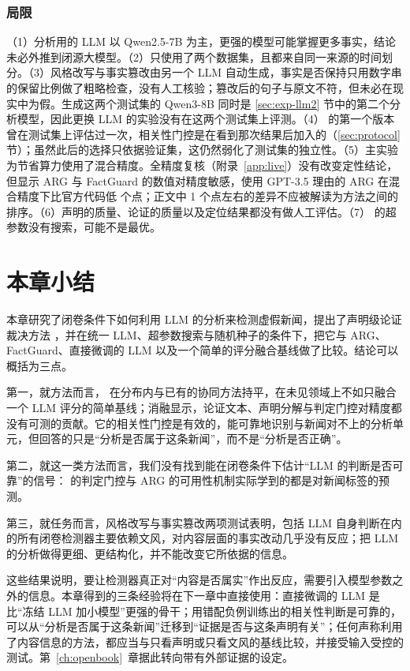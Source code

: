 \subsubsection{局限}
（1）分析用的 LLM 以 Qwen2.5-7B 为主，更强的模型可能掌握更多事实，结论未必外推到闭源大模型。（2）只使用了两个数据集，且都来自同一来源的时间划分。（3）风格改写与事实篡改由另一个 LLM 自动生成，事实是否保持只用数字串的保留比例做了粗略检查，没有人工核验；篡改后的句子与原文不符，但未必在现实中为假。生成这两个测试集的 Qwen3-8B 同时是 \ref{sec:exp-llm2} 节中的第二个分析模型，因此更换 LLM 的实验没有在这两个测试集上评测。（4）\method{} 的第一个版本曾在测试集上评估过一次，相关性门控是在看到那次结果后加入的（\ref{sec:protocol} 节）；虽然此后的选择只依据验证集，这仍然弱化了测试集的独立性。（5）主实验为节省算力使用了混合精度。全精度复核（附录~\ref{app:live}）没有改变定性结论，但显示 ARG 与 FactGuard 的数值对精度敏感，使用 GPT-3.5 理由的 ARG 在混合精度下比官方代码低  个点；正文中 1 个点左右的差异不应被解读为方法之间的排序。（6）声明的质量、论证的质量以及定位结果都没有做人工评估。（7）\method{} 的超参数没有搜索，可能不是最优。

\section{本章小结}\label{sec:ch3-summary}

本章研究了闭卷条件下如何利用 LLM 的分析来检测虚假新闻，提出了声明级论证裁决方法 \method{}，并在统一 LLM、超参数搜索与随机种子的条件下，把它与 ARG、FactGuard、直接微调的 LLM 以及一个简单的评分融合基线做了比较。结论可以概括为三点。

第一，就方法而言，\method{} 在分布内与已有的协同方法持平，在未见领域上不如只融合一个 LLM 评分的简单基线；消融显示，论证文本、声明分解与判定门控对精度都没有可测的贡献。它的相关性门控是有效的，能可靠地识别与新闻对不上的分析单元，但回答的只是“分析是否属于这条新闻”，而不是“分析是否正确”。

第二，就这一类方法而言，我们没有找到能在闭卷条件下估计“LLM 的判断是否可靠”的信号：\method{} 的判定门控与 ARG 的可用性机制实际学到的都是对新闻标签的预测。

第三，就任务而言，风格改写与事实篡改两项测试表明，包括 LLM 自身判断在内的所有闭卷检测器主要依赖文风，对内容层面的事实改动几乎没有反应；把 LLM 的分析做得更细、更结构化，并不能改变它所依据的信息。

这些结果说明，要让检测器真正对“内容是否属实”作出反应，需要引入模型参数之外的信息。本章得到的三条经验将在下一章中直接使用：直接微调的 LLM 是比“冻结 LLM 加小模型”更强的骨干；用错配负例训练出的相关性判断是可靠的，可以从“分析是否属于这条新闻”迁移到“证据是否与这条声明有关”；任何声称利用了内容信息的方法，都应当与只看声明或只看文风的基线比较，并接受输入受控的测试。第~\ref{ch:openbook}~章据此转向带有外部证据的设定。
